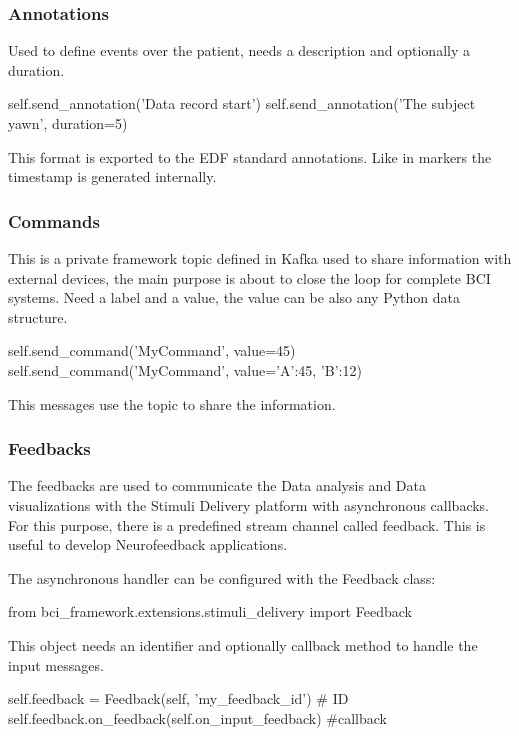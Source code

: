 \subsubsection{Annotations}

Used to define events over the patient, needs a description and optionally a duration.
\begin{python}
self.send_annotation('Data record start')
self.send_annotation('The subject yawn', duration=5)
\end{python}
This format is exported to the EDF standard annotations. Like in markers the timestamp is generated internally.


\subsubsection{Commands}

This is a private framework topic defined in Kafka used to share information with external devices, the main purpose is about to close the loop for complete BCI systems. Need a label and a value, the value can be also any Python data structure.
\begin{python}
self.send_command('MyCommand', value=45)
self.send_command('MyCommand', value={'A':45, 'B':12})
\end{python}
This messages use the  topic to share the information. 

\subsubsection{Feedbacks}\label{ch4:feedbacks}

The feedbacks are used to communicate the Data analysis and Data visualizations with the Stimuli Delivery platform with asynchronous callbacks. For this purpose, there is a predefined stream channel called feedback. This is useful to develop Neurofeedback applications.

The asynchronous handler can be configured with the Feedback class:
\begin{python}
from bci_framework.extensions.stimuli_delivery import Feedback
\end{python}

This object needs an identifier and optionally callback method to handle the input messages.
\begin{python}
self.feedback = Feedback(self, 'my_feedback_id')  # ID
self.feedback.on_feedback(self.on_input_feedback)  #callback
\end{python}

